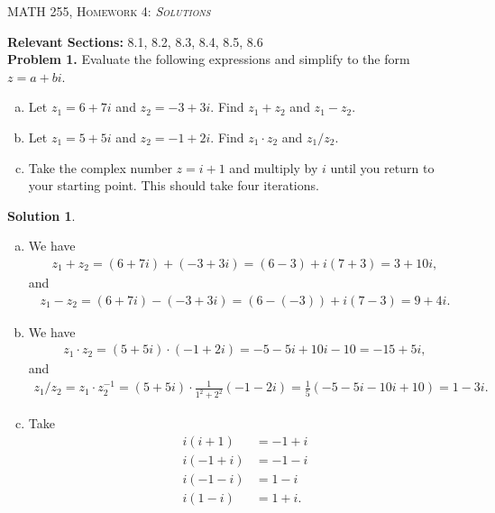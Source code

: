 \documentclass[12pt]{report} %
\theoremstyle{definition}
\newtheorem{solution}{Solution}
\begin{document}
\begin{center}
   \textsc{\large MATH 255, Homework 4: \emph{Solutions}}\\
\end{center}
\vspace{.5cm}

\noindent\textbf{Relevant Sections:} 8.1, 8.2, 8.3, 8.4, 8.5, 8.6 \\

\noindent\textbf{Problem 1.} Evaluate the following expressions and simplify to the form $z=a+bi$.
\begin{enumerate}[(a)]
    \item Let $z_1=6+7i$ and $z_2=-3+3i$.  Find $z_1+z_2$ and $z_1-z_2$.
    \item Let $z_1=5+5i$ and $z_2=-1+2i$.  Find $z_1\cdot z_2$ and $z_1/z_2$.
    \item Take the complex number $z=i+1$ and multiply by $i$ until you return to your starting point.  This should take four iterations.
\end{enumerate}

\begin{solution}~
\begin{enumerate}[(a)]
    \item We have
    \begin{align*}
        z_1+z_2 = (6+7i)+(-3+3i)=(6-3)+i(7+3)=3+10i,
    \end{align*}
    and
    \begin{align*}
        z_1-z_2 = (6+7i)-(-3+3i)=(6-(-3))+i(7-3)=9+4i.
    \end{align*}
    \item We have
    \begin{align*}
        z_1\cdot z_2 = (5+5i)\cdot (-1+2i) = -5-5i+10i-10=-15+5i,
    \end{align*}
    and
    \begin{align*}
        z_1/z_2 = z_1 \cdot z_2^{-1} = (5+5i)\cdot \frac{1}{1^2+2^2}(-1-2i)=\frac{1}{5}(-5-5i-10i+10)=1-3i.
    \end{align*}
    \item Take
    \begin{align}
    i(i+1) &= -1+i\\    
    i(-1+i) &= -1-i\\
    i(-1-i) &= 1-i\\
    i(1-i) &= 1+i.
    \end{align}
\end{enumerate}
\end{solution}
\end{document}
